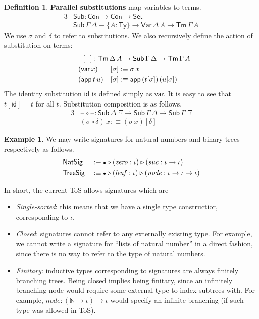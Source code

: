 \documentclass[12pt,a4paper,twoside,openany]{book}
\theoremstyle{remark}
\theoremstyle{definition}
\newtheorem{mydefinition}{Definition}
\newtheorem{myexample}{Example}
\theoremstyle{theorem}
\newcommand{\mi}[1]{\mathit{#1}}
\newcommand{\ms}[1]{\mathsf{#1}}
\newcommand{\id}{\mathsf{id}}
\newcommand{\Con}{\mathsf{Con}}
\newcommand{\Sub}{\mathsf{Sub}}
\newcommand{\Tm}{\mathsf{Tm}}
\newcommand{\Ty}{\mathsf{Ty}}
\newcommand{\blank}{\mathord{\hspace{1pt}\text{--}\hspace{1pt}}}
\newcommand{\Set}{\mathsf{Set}}
\newcommand{\ext}{\triangleright}
\newcommand{\emptycon}{\scaleobj{.75}\bullet}
\newcommand{\Var}{\ms{Var}}
\newcommand{\var}{\ms{var}}
\newcommand{\app}{\ms{app}}
\newcommand{\defn}{:\equiv}
\begin{document}
\begin{mydefinition} \textbf{Parallel substitutions} map variables to terms.
\begin{alignat*}{3}
&\Sub : \Con \to \Con \to \Set\\
&\Sub\,\Gamma\,\Delta \equiv \{A : \Ty\} \to \Var\,\Delta\,A \to \Tm\,\Gamma\,A
\end{alignat*}
We use $\sigma$ and $\delta$ to refer to substitutions. We also recursively
define the action of substitution on terms:
\begin{alignat*}{3}
  &\rlap{$\blank[\blank] : \Tm\,\Delta\,A \to \Sub\,\Gamma\,\Delta \to \Tm\,\Gamma\,A$}\\
  &(\var\, x)   &&[ \sigma ] \defn \sigma\,x\\
  &(\app\,t\,u) &&[ \sigma ] \defn \app\,(t[\sigma])\,(u[\sigma])
\end{alignat*}
The identity substitution $\id$ is defined simply as $\var$. It is easy to see that
$t[\id] = t$ for all $t$. Substitution composition is as follows.
\begin{alignat*}{3}
  &\blank\!\circ\!\blank : \Sub\,\Delta\,\Xi \to \Sub\,\Gamma\,\Delta \to \Sub\,\Gamma\,\Xi\\
  &(\sigma \circ \delta)\,x \defn (\sigma\,x)[\delta]
\end{alignat*}
\end{mydefinition}

\begin{myexample} We may write signatures for natural numbers and binary trees respectively as follows.
\begin{alignat*}{3}
  & \ms{NatSig}  &&\defn \emptycon \ext (\mi{zero} : \iota) \ext (\mi{suc} : \iota \to \iota)\\
  & \ms{TreeSig} &&\defn \emptycon \ext (\mi{leaf} : \iota) \ext (\mi{node} : \iota \to \iota \to \iota)
\end{alignat*}
\end{myexample}
In short, the current ToS allows signatures which are
\begin{itemize}
\item \emph{Single-sorted}: this means that we have a single type constructior, corresponding to $\iota$.
\item \emph{Closed}: signatures cannot refer to any externally existing type. For example, we cannot write a signature for ``lists of natural number'' in a direct fashion, since there is no way to refer to the type of natural numbers.
\item \emph{Finitary}: inductive types corresponding to signatures are always
  finitely branching trees. Being closed implies being finitary, since an
  infinitely branching node would require some external type to index subtrees
  with. For example, $\mi{node} : (\mathbb{N} \to \iota) \to \iota$ would
  specify an infinite branching (if such type was allowed in ToS).
\end{itemize}
\end{document}
